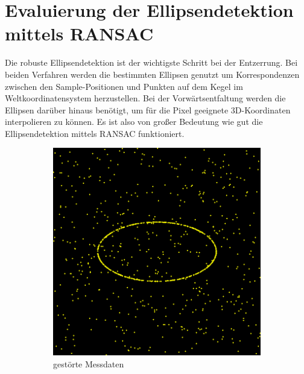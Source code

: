 {\section{Evaluierung der Ellipsendetektion mittels RANSAC}
Die robuste Ellipsendetektion ist der wichtigste Schritt bei der Entzerrung. Bei beiden Verfahren werden die bestimmten Ellipsen genutzt um Korrespondenzen zwischen den Sample-Positionen und Punkten auf dem Kegel im Weltkoordinatensystem herzustellen. Bei der Vorwärtsentfaltung werden die Ellipsen darüber hinaus benötigt, um für die Pixel geeignete 3D-Koordinaten interpolieren zu können. Es ist also von großer Bedeutung wie gut die Ellipsendetektion mittels RANSAC funktioniert.  


\begin{figure}[!htb]
	\centering
	\begin{subfigure}{.5\textwidth}
		\centering
		\includegraphics[width=.9\textwidth]{images/ransac50_0.png}
		\caption{gestörte Messdaten}
		\label{fig:uniformRansac1}
	\end{subfigure}%
	\begin{subfigure}{.5\textwidth}
		\centering

\end{subfigure}
\end{figure}}

